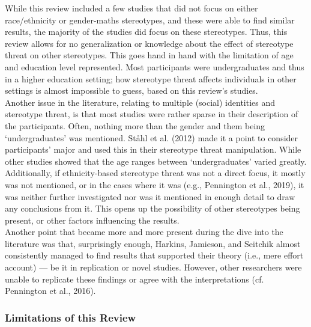 \documentclass[
  stu, a4paper,floatsintext]{apa7}
\begin{document}
While this review included a few studies that did not focus on either race/ethnicity or gender-maths stereotypes, and these were able to find similar results, the majority of the studies did focus on these stereotypes.
Thus, this review allows for no generalization or knowledge about the effect of stereotype threat on other stereotypes.
This goes hand in hand with the limitation of age and education level represented. Most participants were undergraduates and thus in a higher education setting; how stereotype threat affects individuals in other settings is almost impossible to guess, based on this review's studies.\\
Another issue in the literature, relating to multiple (social) identities and stereotype threat, is that most studies were rather sparse in their description of the participants.
Often, nothing more than the gender and them being `undergraduates' was mentioned.
Ståhl et al. (2012) made it a point to consider participants' major and used this in their stereotype threat manipulation. While other studies showed that the age ranges between `undergraduates' varied greatly.
Additionally, if ethnicity-based stereotype threat was not a direct focus, it mostly was not mentioned, or in the cases where it was (e.g., Pennington et al., 2019), it was neither further investigated nor was it mentioned in enough detail to draw any conclusions from it.
This opens up the possibility of other stereotypes being present, or other factors influencing the results.\\
Another point that became more and more present during the dive into the literature was that, surprisingly enough, Harkins, Jamieson, and Seitchik almost consistently managed to find results that supported their theory (i.e., mere effort account) --- be it in replication or novel studies.
However, other researchers were unable to replicate these findings or agree with the interpretations (cf. Pennington et al., 2016).

\subsubsection{Limitations of this Review}\label{limitations-of-this-review}
\end{document}
